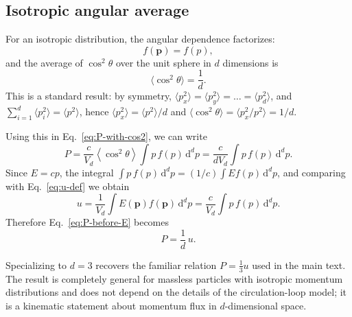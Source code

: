 \documentclass[11pt]{article}
\begin{document}
    \subsection{Isotropic angular average}

        For an isotropic distribution, the angular dependence factorizes:
        \begin{equation}
            f(\boldsymbol{p})
            = f(p),
        \end{equation}
        and the average of $\cos^2\theta$ over the unit sphere in $d$ dimensions is
        \begin{equation}
            \langle \cos^2\theta \rangle
            = \frac{1}{d}.
        \end{equation}
        This is a standard result: by symmetry,
        $\langle p_x^2 \rangle = \langle p_y^2 \rangle = \dots = \langle p_d^2 \rangle$, and
        $\sum_{i=1}^d \langle p_i^2 \rangle = \langle p^2 \rangle$, hence
        $\langle p_x^2 \rangle = \langle p^2 \rangle/d$ and
        $\langle \cos^2\theta \rangle = \langle p_x^2/p^2 \rangle = 1/d$.

        Using this in Eq.~\eqref{eq:P-with-cos2}, we can write
        \begin{equation}
            P
            = \frac{c}{V_d}
            \left\langle \cos^2\theta \right\rangle
            \int p\, f(p)\,\mathrm{d}^d p
            = \frac{c}{d V_d}
            \int p\, f(p)\,\mathrm{d}^d p.
            \label{eq:P-before-E}
        \end{equation}
        Since $E = c p$, the integral
        $\int p\,f(p)\,\mathrm{d}^d p = (1/c)\int E f(p)\,\mathrm{d}^d p$, and comparing with
        Eq.~\eqref{eq:u-def} we obtain
        \begin{equation}
            u
            = \frac{1}{V_d}
            \int E(\boldsymbol{p}) f(\boldsymbol{p})\,\mathrm{d}^d p
            = \frac{c}{V_d}
            \int p\, f(p)\,\mathrm{d}^d p.
        \end{equation}
        Therefore Eq.~\eqref{eq:P-before-E} becomes
        \begin{equation}
            P
            = \frac{1}{d}\,u.
        \end{equation}

        Specializing to $d=3$ recovers the familiar relation
        $P = \tfrac{1}{3}u$ used in the main text. The result is completely general for
        massless particles with isotropic momentum distributions and does not depend on
        the details of the circulation-loop model; it is a kinematic statement about
        momentum flux in $d$-dimensional space.
\end{document}
